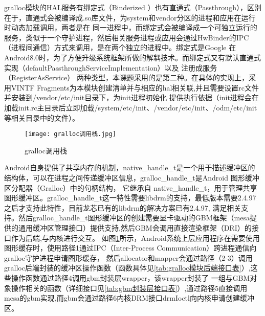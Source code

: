 gralloc模块的HAL服务有绑定式（Binderized ）也有直通式（Passthrough），区别在于，直通式会被编译成.so库文件，为system和vendor分区的进程和应用在运行时动态加载调用，两者是在
同一进程中，而绑定式会被编译成一个可独立运行的服务，类似于一个守护进程，然后相关服务进程或应用会通过HwBinder的IPC（进程间通信）方式来调用，是在两个独立的进程中。绑定式是Google
在Android8.0时，为了方便升级系统框架所做的解耦技术。而绑定式又有默认直通式实现（defaultPassthroughServiceImplementation）以及 注册成服务（RegisterAsService）
两种类型，本课题采用的是第二种。在具体的实现上，采用VINTF Fragments为本模块创建清单并与相应的hal相关联,并且需要设置rc文件并安装到/vendor/etc/init目录下，为init进程初始化
提供执行依据（init进程会在加载init.rc主目录后立即加载/system/etc/init、/vendor/etc/init、/odm/etc/init等相关目录中的文件）。

\begin{figure}[h]
  \centering
  \texttt{[image: gralloc调用栈.jpg]}
  \caption{gralloc调用栈}
  \label{fig:gralloc调用栈}
\end{figure}

Android自身提供了共享内存的机制，native\_handle\_t是一个用于描述缓冲区的结构体，可以在进程之间传递缓冲区信息，gralloc\_handle\_t是Android 图形缓冲区分配器（Gralloc）中的句柄结构，
它继承自 native\_handle\_t，用于管理共享图形缓冲区。gralloc\_handle\_t这一特性需要libdrm的支持，最低版本需要2.4.97之后才支持此特性，目前龙芯已有的libdrm的解决方案已有2.4.97,
满足相关支持。然后gralloc\_handle\_t图形缓冲区的创建需要显卡驱动的GBM框架（mesa提供的通用缓冲区管理接口）提供支持,然后GBM会调用直接渲染框架（DRI）的接口作为后端,与内核进行交互。
如图\ref{fig:gralloc调用栈}所示，Android系统上层应用程序在需要使用图形缓存时，使用路径1通过IPC（Inter-Process Communication）跨进程通信向gralloc守护进程申请图形缓存，
然后allocator和mapper会通过路径（2-3）调用gralloc后端封装的缓冲区操作函数（函数具体见\ref{tab:gralloc模块后端接口表}）,这些操作函数通过路径4调用gbm封装层wrapper，该wrapper封装了
一组与GBM对象操作相关的函数（详细接口见\ref{tab:gbm封装层接口表}）,通过路径5直接调用mesa的gbm实现,而gbm会通过路径6内核DRM接口drmIoctl向内核申请创建缓冲区。

